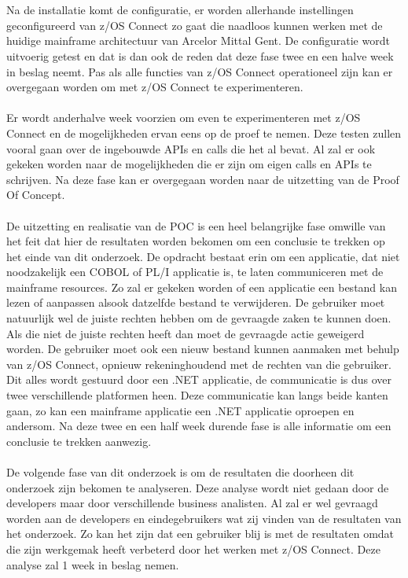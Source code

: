 \\ \\
Na de installatie komt de configuratie, er worden allerhande instellingen geconfigureerd van z/OS Connect zo gaat die naadloos kunnen werken met de huidige mainframe architectuur van Arcelor Mittal Gent. De configuratie wordt uitvoerig getest en dat is dan ook de reden dat deze fase twee en een halve week in beslag neemt. Pas als alle functies van z/OS Connect operationeel zijn kan er overgegaan worden om met z/OS Connect te experimenteren.
\\ \\
Er wordt anderhalve week voorzien om even te experimenteren met z/OS Connect en de mogelijkheden ervan eens op de proef te nemen. Deze testen zullen vooral gaan over de ingebouwde APIs en calls die het al bevat. Al zal er ook gekeken worden naar de mogelijkheden die er zijn om eigen calls en APIs te schrijven. Na deze fase kan er overgegaan worden naar de uitzetting van de Proof Of Concept.
\\ \\
De uitzetting en realisatie van de POC is een heel belangrijke fase omwille van het feit dat hier de resultaten worden bekomen om een conclusie te trekken op het einde van dit onderzoek. De opdracht bestaat erin om een applicatie, dat niet noodzakelijk een COBOL of PL/I applicatie is, te laten communiceren met de mainframe resources. Zo zal er gekeken worden of een applicatie een bestand kan lezen of aanpassen alsook datzelfde bestand te verwijderen. De gebruiker moet natuurlijk wel de juiste rechten hebben om de gevraagde zaken te kunnen doen. Als die niet de juiste rechten heeft dan moet de gevraagde actie geweigerd worden. De gebruiker moet ook een nieuw bestand kunnen aanmaken met behulp van z/OS Connect, opnieuw rekeninghoudend met de rechten van die gebruiker. Dit alles wordt gestuurd door een .NET applicatie, de communicatie is dus over twee verschillende platformen heen. Deze communicatie kan langs beide kanten gaan, zo kan een mainframe applicatie een .NET applicatie oproepen en andersom. Na deze twee en een half week durende fase is alle informatie om een conclusie te trekken aanwezig.
\\ \\
De volgende fase van dit onderzoek is om de resultaten die doorheen dit onderzoek zijn bekomen te analyseren. Deze analyse wordt niet gedaan door de developers maar door verschillende business analisten. Al zal er wel gevraagd worden aan de developers en eindegebruikers wat zij vinden van de resultaten van het onderzoek. Zo kan het zijn dat een gebruiker blij is met de resultaten omdat die zijn werkgemak heeft verbeterd door het werken met z/OS Connect. Deze analyse zal 1 week in beslag nemen.
